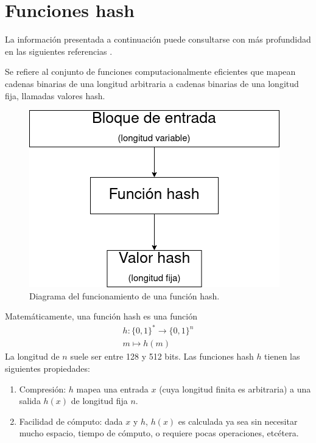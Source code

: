 %
%

\section{Funciones hash}
\label{sec:hash}

La información presentada a continuación puede consultarse con más profundidad
en las siguientes referencias
\cite{hash_hussein, menezes, DBLP:series/isc/DelfsK07, hash_gupta}.

Se refiere al conjunto de funciones computacionalmente eficientes que
mapean cadenas binarias de una longitud arbitraria a cadenas binarias
de una longitud fija, llamadas valores hash.

\begin{figure}
  \begin{center}
    \includegraphics[width=0.6\linewidth]{diagramas/hash}
    \caption{Diagrama del funcionamiento de una función hash.}
   \end{center}
\end{figure}


Matemáticamente, una función hash es una función
\begin{equation}
  \label{funcion_hash_def}
  \begin{split}
    h: \{0, 1\}^* \longrightarrow \{0,1\}^n \\
    m \longmapsto h(m)
  \end{split}
\end{equation}
La longitud de $n$ suele ser entre 128 y 512 bits. Las funciones hash
$h$ tienen las siguientes propiedades:

\begin{enumerate}
  \item Compresión: $h$ mapea una entrada $x$ (cuya longitud
    finita es arbitraria) a una salida $h(x)$ de longitud fija $n$.
  \item Facilidad de cómputo: dada $x$ y $h$, $h(x)$ es
    calculada ya sea sin necesitar mucho espacio, tiempo de cómputo, o
    requiere pocas operaciones, etcétera.
\end{enumerate}


